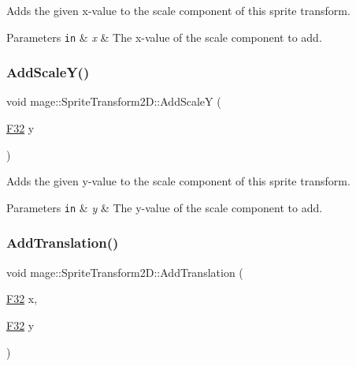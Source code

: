 Adds the given x-\/value to the scale component of this sprite transform.


\begin{DoxyParams}[1]{Parameters}
\mbox{\tt in}  & {\em x} & The x-\/value of the scale component to add. \\
\hline
\end{DoxyParams}
\mbox{\label{classmage_1_1_sprite_transform2_d_abc6fcc9b78da648b577d46b5a7b1ad26}} 
\subsubsection{\texorpdfstring{Add\+Scale\+Y()}{AddScaleY()}}
{\footnotesize\ttfamily void mage\+::\+Sprite\+Transform2\+D\+::\+Add\+ScaleY (\begin{DoxyParamCaption}\item[{\mbox{\hyperlink{namespacemage_aa97e833b45f06d60a0a9c4fc22ae02c0}{F32}}}]{y }\end{DoxyParamCaption})\hspace{0.3cm}{\ttfamily [noexcept]}}

Adds the given y-\/value to the scale component of this sprite transform.


\begin{DoxyParams}[1]{Parameters}
\mbox{\tt in}  & {\em y} & The y-\/value of the scale component to add. \\
\hline
\end{DoxyParams}
\mbox{\label{classmage_1_1_sprite_transform2_d_ade83dd0ee8cedea2420a90b510c7f6b9}} 
\subsubsection{\texorpdfstring{Add\+Translation()}{AddTranslation()}\hspace{0.1cm}{\footnotesize\ttfamily [1/3]}}
{\footnotesize\ttfamily void mage\+::\+Sprite\+Transform2\+D\+::\+Add\+Translation (\begin{DoxyParamCaption}\item[{\mbox{\hyperlink{namespacemage_aa97e833b45f06d60a0a9c4fc22ae02c0}{F32}}}]{x,  }\item[{\mbox{\hyperlink{namespacemage_aa97e833b45f06d60a0a9c4fc22ae02c0}{F32}}}]{y }\end{DoxyParamCaption})\hspace{0.3cm}{\ttfamily [noexcept]}}

